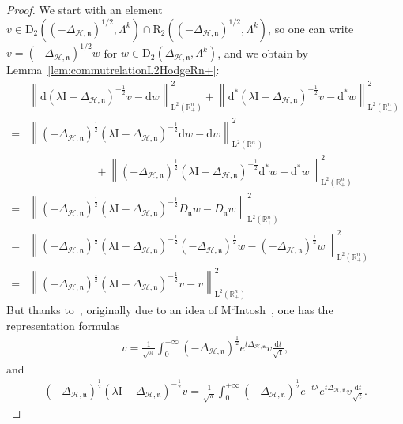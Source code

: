 \documentclass[10pt]{amsart}
\theoremstyle{definition}\newtheorem{defi}[theo]{Definition}\newtheorem{rema}[theo]{Remark}\newtheorem{exam}[theo]{Example}\newtheorem{exem}[theo]{Example}\newtheorem{nota}[theo]{Notation}
\newcommand{\bbR}{\mathbb{R}}
\newcommand{\rmd}{\mathrm{d}}
\newcommand{\rmD}{\mathrm{D}}
\newcommand{\rmL}{\mathrm{L}}
\newcommand{\rmR}{\mathrm{R}}
\newcommand{\rmI}{\mathrm{I}}
\newcommand{\clH}{\mathcal{H}}
\newcommand{\fkn}{\mathfrak{n}}
\begin{document}
\begin{proof}
We start with an element $v\in\rmD_2((-\Delta_{\clH,\fkn})^{1/2},\Lambda^k)\cap\rmR _2((-\Delta_{\clH,\fkn})^{1/2},\Lambda^k)$, so one can write $v=(-\Delta_{\clH,\fkn})^{1/2}w$ for $w\in\rmD_2(\Delta_{\clH,\fkn},\Lambda^k)$, and we obtain by Lemma~\ref{lem:commutrelationL2HodgeRn+}:
\begin{align*}
&\left\| \rmd\left(\lambda\rmI -\Delta_{\clH,\fkn}\right)^{-\frac{1}{2}} v -\rmd w\right\|_{\rmL^2\left(\bbR^n_+\right)}^2+\left\| \rmd^\ast\left(\lambda\rmI -\Delta_{\clH,\fkn}\right)^{-\frac{1}{2}} v -\rmd^\ast w\right\|_{\rmL^2\left(\bbR^n_+\right)}^2\\
= & \left\| \left(-\Delta_{\clH,\fkn}\right)^{\frac{1}{2}}\left(\lambda\rmI -\Delta_{\clH,\fkn}\right)^{-\frac{1}{2}} \rmd w -\rmd w\right\|_{\rmL^2\left(\bbR^n_+\right)}^2 \\
&\qquad\qquad\qquad+ \left\| \left(-\Delta_{\clH,\fkn}\right)^{\frac{1}{2}}\left(\lambda\rmI -\Delta_{\clH,\fkn}\right)^{-\frac{1}{2}} \rmd^\ast w -\rmd^\ast w\right\|_{\rmL^2\left(\bbR^n_+\right)}^2\\
= & \left\| \left(-\Delta_{\clH,\fkn}\right)^{\frac{1}{2}}\left(\lambda\rmI -\Delta_{\clH,\fkn}\right)^{-\frac{1}{2}} D_\fkn w -D_\fkn w\right\|_{\rmL^2\left(\bbR^n_+\right)}^2 \\
= & \left\| \left(-\Delta_{\clH,\fkn}\right)^{\frac{1}{2}}\left(\lambda\rmI -\Delta_{\clH,\fkn}\right)^{-\frac{1}{2}} \left(-\Delta_{\clH,\fkn}\right)^{\frac{1}{2}} w -\left(-\Delta_{\clH,\fkn}\right)^{\frac{1}{2}}w\right\|_{\rmL^2\left(\bbR^n_+\right)}^2\\
= & \left\| \left(-\Delta_{\clH,\fkn}\right)^{\frac{1}{2}}\left(\lambda\rmI -\Delta_{\clH,\fkn}\right)^{-\frac{1}{2}} v -v\right\|_{\rmL^2\left(\bbR^n_+\right)}^2
\end{align*}
But thanks to~\cite[Theorem~5.2.6]{bookHaase2006}, originally due to an idea of $\text{M}^{\text{c}}$Intosh~\cite{McIntosh1986}, one has the representation formulas
\begin{align*}
v= \frac{1}{\sqrt{\pi}}\int_{0}^{+\infty} \left(-\Delta_{\clH,\fkn}\right)^{\frac{1}{2}}e^{t\Delta_{\clH,\fkn}} v\frac{\rmd t}{\sqrt{t}},
\end{align*}
and
\begin{align*}
\left(-\Delta_{\clH,\fkn}\right)^{\frac{1}{2}}\left(\lambda\rmI -\Delta_{\clH,\fkn}\right)^{-\frac{1}{2}}v= \frac{1}{\sqrt{\pi}}\int_{0}^{+\infty}
\left(-\Delta_{\clH,\fkn}\right)^{\frac{1}{2}}e^{-t\lambda}e^{t\Delta_{\clH,\fkn}} v\frac{\rmd t}{\sqrt{t}}.
\end{align*}

\end{proof}
\end{document}
